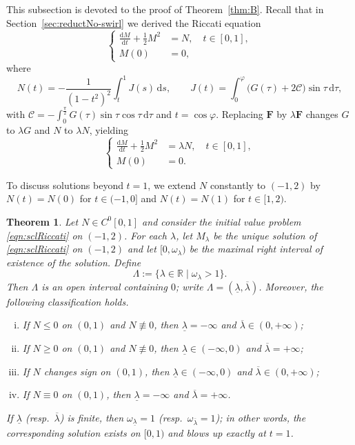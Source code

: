 \documentclass{amsart}
\newtheorem{theorem}{Theorem}[section]
\newcommand{\BF}{{\boldsymbol{F}}}
\newcommand{\mcC}{\mathcal{C}}
\begin{document}
This subsection is devoted to the proof of Theorem~\ref{thm:B}. Recall that in Section~\ref{sec:reductNo-swirl} we derived the Riccati equation
\begin{equation*}
\left\{
\begin{aligned}
\frac{\mathrm{d}M}{\mathrm{d}t} + \frac12 M^{2} &= N, \quad t \in [0,1],\\
M(0)&=0,
\end{aligned}
\right.
\end{equation*}
where
\[
N(t)=-\frac{1}{(1-t^{2})^{2}}\int_{t}^{1} J(s)\,\mathrm{d}s,\qquad
J(t)=\int_{0}^{\varphi} \bigl(G(\tau)+2\mcC\bigr)\sin\tau\,\mathrm{d}\tau,
\]
with $\mcC=-\int_{0}^{\frac{\pi}{2}} G(\tau) \sin\tau \cos\tau \, \mathrm{d}\tau$ and $t=\cos\varphi$.
Replacing $\BF$ by $\lambda\BF$ changes $G$ to $\lambda G$ and $N$ to $\lambda N$, yielding
\begin{equation}\label{eqn:sclRiccati}
\left\{
\begin{aligned}
\frac{\mathrm{d}M}{\mathrm{d}t} + \frac12 M^{2} &= \lambda N, \quad t \in [0,1],\\
M(0)&=0.
\end{aligned}
\right.
\end{equation}


To discuss solutions beyond $t=1$, we extend $N$ constantly to $(-1,2)$ by $N(t)=N(0)$ for $t\in(-1,0]$ and $N(t)=N(1)$ for $t\in[1,2)$.


\begin{theorem}\label{thm:Auxiliary}
Let $N\in C^{0}[0,1]$ and consider the initial value problem \eqref{eqn:sclRiccati} on $(-1,2)$.
For each $\lambda$, let $M_{\lambda}$ be the unique solution of \eqref{eqn:sclRiccati} on $(-1,2)$ and let $[0,\omega_{\lambda})$ be the maximal right interval of existence of the solution. Define
\[
\Lambda:=\{\lambda\in\mathbb{R}\mid\omega_{\lambda}>1\}.
\]
Then $\Lambda$ is an open interval containing $0$; write $\Lambda=(\underline{\lambda},\overline{\lambda})$.
Moreover, the following classification holds.
\begin{enumerate}[(i)]
\item If $N\le0$ on $(0,1)$ and $N\not\equiv0$, then $\underline{\lambda}=-\infty$ and $\overline{\lambda}\in(0,+\infty)$;
\item If $N\ge0$ on $(0,1)$ and $N\not\equiv0$, then $\underline{\lambda}\in(-\infty,0)$ and $\overline{\lambda}=+\infty$;
\item If $N$ changes sign on $(0,1)$, then $\underline{\lambda}\in(-\infty,0)$ and $\overline{\lambda}\in(0,+\infty)$;
\item If $N\equiv0$ on $(0,1)$, then $\underline{\lambda}=-\infty$ and $\overline{\lambda}=+\infty$.
\end{enumerate}
If $\underline{\lambda}$ (resp.\ $\overline{\lambda}$) is finite, then $\omega_{\underline{\lambda}}=1$ (resp.\ $\omega_{\overline{\lambda}}=1$); in other words, the corresponding solution exists on $[0,1)$ and blows up exactly at $t=1$.
\end{theorem}
\end{document}
